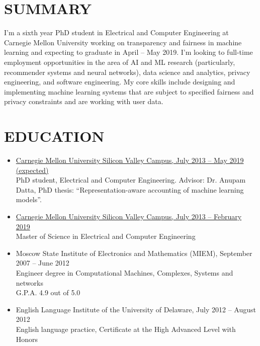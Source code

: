 \documentclass{res}
\begin{document}
 


\address{Phone: (302) 415-4176\\Email, Google Hangouts: \href{mailto:sophia.m.kovaleva@gmail.com}{sophia.m.kovaleva@gmail.com}}


\begin{resume}

\section{SUMMARY}

I'm a sixth year PhD student in Electrical and Computer Engineering at Carnegie Mellon University working on transparency and fairness in machine learning and expecting to graduate in April -- May 2019.
I'm looking to full-time employment opportunities in the area of AI and ML research (particularly, recommender systems and neural networks), data science and analytics, privacy engineering, and software engineering. 
My core skills include designing and implementing machine learning systems that are subject to specified fairness and privacy constraints and are working with user data.


\section{EDUCATION}
\begin{itemize}
	\item
		\underline{Carnegie Mellon University Silicon Valley Campus, July 2013 -- May 2019 (expected)}\\
		PhD student, Electrical and Computer Engineering. Advisor: Dr. Anupam Datta, PhD thesis: ``Representation-aware accounting of machine learning models''.
	\item
		\underline{Carnegie Mellon University Silicon Valley Campus, July 2013 -- February 2019}\\
		Master of Science in Electrical and Computer Engineering
	\item
		Moscow State Institute of Electronics and Mathematics (MIEM), September 2007 -- June 2012\\
		Engineer degree in Computational Machines, Complexes, Systems and networks\\
		G.P.A. 4.9 out of 5.0
	\item
		English Language Institute of the University of Delaware, July 2012 -- August 2012\\
		English language practice, Certificate at the High Advanced Level with Honors
\end{itemize}


\end{resume}
\end{document}
